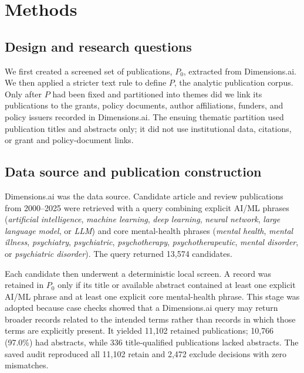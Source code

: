 \documentclass[12pt]{article}
\begin{document}
\section{Methods}


\subsection{Design and research questions}

We first created a screened set of publications, $P_0$, extracted from Dimensions.ai. We then applied a stricter text rule to define $P$, the analytic publication corpus. Only after $P$ had been fixed and partitioned into themes did we link its publications to the grants, policy documents, author affiliations, funders, and policy issuers recorded in Dimensions.ai. The ensuing thematic partition used publication titles and abstracts only; it did not use institutional data, citations, or grant and policy-document links.



\subsection{Data source and publication construction}

Dimensions.ai was the data source. Candidate article and review publications from 2000--2025 were retrieved with a query combining explicit AI/ML phrases (\emph{artificial intelligence}, \emph{machine learning}, \emph{deep learning}, \emph{neural network}, \emph{large language model}, or \emph{LLM}) and core mental-health phrases (\emph{mental health}, \emph{mental illness}, \emph{psychiatry}, \emph{psychiatric}, \emph{psychotherapy}, \emph{psychotherapeutic}, \emph{mental disorder}, or \emph{psychiatric disorder}). The query returned 13,574 candidates.

Each candidate then underwent a deterministic local screen. A record was retained in $P_0$ only if its title or available abstract contained at least one explicit AI/ML phrase and at least one explicit core mental-health phrase. This stage was adopted because case checks showed that a Dimensions.ai query may return broader records related to the intended terms rather than records in which those terms are explicitly present. It yielded 11,102 retained publications; 10,766 (97.0\%) had abstracts, while 336 title-qualified publications lacked abstracts. The saved audit reproduced all 11,102 retain and 2,472 exclude decisions with zero mismatches.
\end{document}

